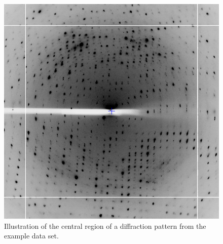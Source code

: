 \documentclass[a4paper, 11pt]{article}
\begin{document}
\begin{figure}
\caption{Illustration of the central region of a diffraction pattern from
  the example data set. \label{figure-diffraction}}
\begin{center}
\includegraphics[scale=0.35]{figures/3qrn-diffraction.png}
\end{center}
\end{figure}
\end{document}
